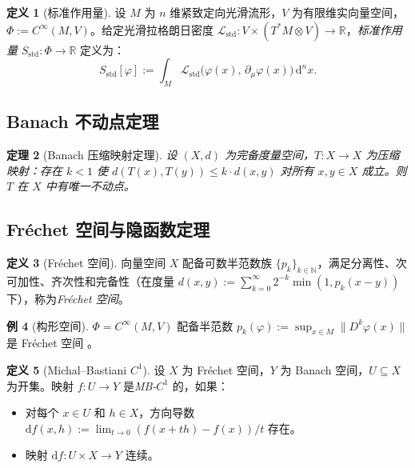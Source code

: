 \documentclass[12pt,a4paper]{article}
\newtheorem{theorem}{定理}[section]
\theoremstyle{definition}
\newtheorem{definition}[theorem]{定义}
\newtheorem{example}[theorem]{例}
\newcommand{\mL}{\mathcal{L}}
\newcommand{\mPhi}{\Phi}
\newcommand{\R}{\mathbb{R}}
\newcommand{\N}{\mathbb{N}}
\newcommand{\diff}{\mathrm{d}}
\newcommand{\dVol}{\,\diff^n x}
\begin{document}
\begin{definition}[标准作用量]
\label{def:std-action}
设 $M$ 为 $n$ 维紧致定向光滑流形，$V$ 为有限维实向量空间，$\mPhi := C^\infty(M, V)$。给定光滑拉格朗日密度 $\mL_{\mathrm{std}}: V \times (T^*M \otimes V) \to \R$，\emph{标准作用量} $S_{\mathrm{std}}: \mPhi \to \R$ 定义为：
\[ S_{\mathrm{std}}[\varphi] := \int_M \mL_{\mathrm{std}}\!\bigl(\varphi(x),\, \partial_\mu\varphi(x)\bigr) \dVol. \]
\end{definition}

\subsection{Banach 不动点定理}

\begin{theorem}[Banach 压缩映射定理]
\label{thm:banach}
设 $(X, d)$ 为完备度量空间，$T: X \to X$ 为压缩映射：存在 $k < 1$ 使 $d(T(x), T(y)) \le k \cdot d(x, y)$ 对所有 $x, y \in X$ 成立。则 $T$ 在 $X$ 中有唯一不动点。
\end{theorem}

\subsection{Fr\'echet 空间与隐函数定理}

\begin{definition}[Fr\'echet 空间]
向量空间 $X$ 配备可数半范数族 $\{p_k\}_{k \in \N}$，满足分离性、次可加性、齐次性和完备性（在度量 $d(x, y) := \sum_{k=0}^\infty 2^{-k} \min(1, p_k(x - y))$ 下），称为\emph{Fr\'echet 空间}。
\end{definition}

\begin{example}[构形空间]
$\mPhi = C^\infty(M, V)$ 配备半范数 $p_k(\varphi) := \sup_{x \in M} \|D^k \varphi(x)\|$ 是 Fr\'echet 空间 \cite{RudinFA, Treves}。
\end{example}

\begin{definition}[Michal--Bastiani $C^1$]
\label{def:mb}
设 $X$ 为 Fr\'echet 空间，$Y$ 为 Banach 空间，$U \subseteq X$ 为开集。映射 $f: U \to Y$ 是\emph{MB-$C^1$} 的，如果：
\begin{itemize}
\item[(MB1)] 对每个 $x \in U$ 和 $h \in X$，方向导数 $\diff f(x, h) := \lim_{t \to 0} (f(x + th) - f(x))/t$ 存在。
\item[(MB2)] 映射 $\diff f: U \times X \to Y$ 连续。
\end{itemize}
\end{definition}
\end{document}
